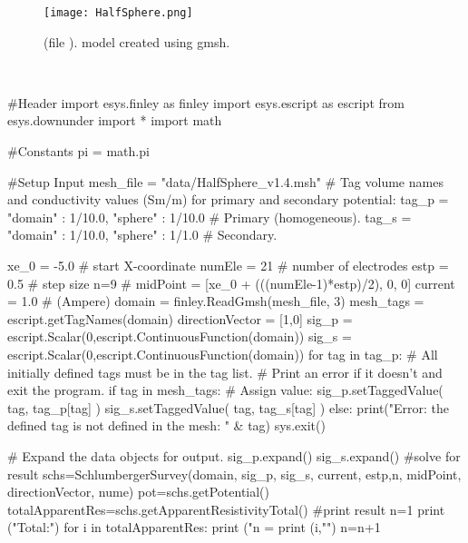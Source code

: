 \begin{figure}
\centering
\texttt{[image: HalfSphere.png]}
\caption{
    (file ). model created using gmsh.}
\label{fig:HalfSphere}
\end{figure}

\begin{pyc}\label{code: dc1}
\
\begin{python}
#Header
import esys.finley      as finley
import esys.escript     as escript
from esys.downunder     import *
import math

#Constants
pi = math.pi

#Setup Input
mesh_file = "data/HalfSphere_v1.4.msh"
# Tag volume names and conductivity values (Sm/m) for primary and secondary potential:
tag_p = {"domain" : 1/10.0, "sphere" :  1/10.0} # Primary (homogeneous).
tag_s = {"domain" : 1/10.0, "sphere" :  1/1.0 } # Secondary.

xe_0 = -5.0 # start X-coordinate
numEle =  21  # number of electrodes
estp =  0.5 # step size
n=9 # 
midPoint = [xe_0 + (((numEle-1)*estp)/2), 0, 0]
current = 1.0 # (Ampere)
domain = finley.ReadGmsh(mesh_file, 3)
mesh_tags = escript.getTagNames(domain)
directionVector = [1,0]
sig_p = escript.Scalar(0,escript.ContinuousFunction(domain))
sig_s = escript.Scalar(0,escript.ContinuousFunction(domain))
for tag in tag_p:
    # All initially defined tags must be in the tag list.
    # Print an error if it doesn't and exit the program.
    if tag in mesh_tags:
        # Assign value:
        sig_p.setTaggedValue( tag, tag_p[tag] )
        sig_s.setTaggedValue( tag, tag_s[tag] )
    else:
        print("Error: the defined tag is not defined in the mesh: " & tag)
        sys.exit()

# Expand the data objects for output.
sig_p.expand()
sig_s.expand()
#solve for result
schs=SchlumbergerSurvey(domain, sig_p, sig_s, current, estp,n, midPoint, directionVector, nume)
pot=schs.getPotential()
totalApparentRes=schs.getApparentResistivityTotal()
#print result
n=1
print ("Total:\n")
for i in totalApparentRes:
    print ("n = %
    print (i,"\n")
    n=n+1
\end{python}
\end{pyc}


